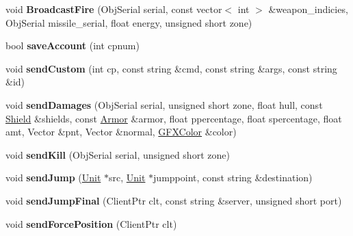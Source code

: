 \begin{DoxyCompactItemize}
\item 
void {\bfseries Broadcast\+Fire} (Obj\+Serial serial, const vector$<$ int $>$ \&weapon\+\_\+indicies, Obj\+Serial missile\+\_\+serial, float energy, unsigned short zone)\hypertarget{classNetServer_a3d213b89f66aee2fa7c0b939412e5ff0}{}\label{classNetServer_a3d213b89f66aee2fa7c0b939412e5ff0}

\item 
bool {\bfseries save\+Account} (int cpnum)\hypertarget{classNetServer_abb0e3fb15b773d5770fd986002597f44}{}\label{classNetServer_abb0e3fb15b773d5770fd986002597f44}

\item 
void {\bfseries send\+Custom} (int cp, const string \&cmd, const string \&args, const string \&id)\hypertarget{classNetServer_a65a4912fd344576217e72987c9f26693}{}\label{classNetServer_a65a4912fd344576217e72987c9f26693}

\item 
void {\bfseries send\+Damages} (Obj\+Serial serial, unsigned short zone, float hull, const \hyperlink{structShield}{Shield} \&shields, const \hyperlink{structArmor}{Armor} \&armor, float ppercentage, float spercentage, float amt, Vector \&pnt, Vector \&normal, \hyperlink{structGFXColor}{G\+F\+X\+Color} \&color)\hypertarget{classNetServer_a1ca1acc1d5722af390df9798c05e43c4}{}\label{classNetServer_a1ca1acc1d5722af390df9798c05e43c4}

\item 
void {\bfseries send\+Kill} (Obj\+Serial serial, unsigned short zone)\hypertarget{classNetServer_a4516e11671e5f793cdf9aa87c6d93c41}{}\label{classNetServer_a4516e11671e5f793cdf9aa87c6d93c41}

\item 
void {\bfseries send\+Jump} (\hyperlink{classUnit}{Unit} $\ast$src, \hyperlink{classUnit}{Unit} $\ast$jumppoint, const string \&destination)\hypertarget{classNetServer_a2b05a28fc2eae7b6794d17d8d31c6e9f}{}\label{classNetServer_a2b05a28fc2eae7b6794d17d8d31c6e9f}

\item 
void {\bfseries send\+Jump\+Final} (Client\+Ptr clt, const string \&server, unsigned short port)\hypertarget{classNetServer_a0e46893008393c8ec1f2acf5b18b4fef}{}\label{classNetServer_a0e46893008393c8ec1f2acf5b18b4fef}

\item 
void {\bfseries send\+Force\+Position} (Client\+Ptr clt)\hypertarget{classNetServer_ac8118d11e5502bad4deacae0feb7adec}{}\label{classNetServer_ac8118d11e5502bad4deacae0feb7adec}


\end{DoxyCompactItemize}
